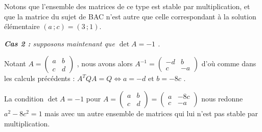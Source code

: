 \medskip

Notons que l'ensemble des matrices de ce type est stable par multiplication, et que la matrice du sujet de BAC n'est autre que celle correspondant à la solution élémentaire
$(a \,; c) = (3 \,; 1)$.




\bigskip

\textit{\textbf{Cas 2 :} supposons maintenant que $\det A = -1$ .}

\medskip

Notant
$A = \begin{pmatrix} 
  a & b \\ 
  c & d
\end{pmatrix}$ ,
nous avons alors
$A^{-1} = \begin{pmatrix} 
  -d & b  \\ 
   c & -a
\end{pmatrix}$
d'où comme dans les calculs précédents :
$A^T Q A = Q \Longleftrightarrow a = -d \text{ et } b = -8c$ .


\bigskip

La condition $\det A = -1$ pour
$A
=
\begin{pmatrix} 
  a & b \\ 
  c & d
\end{pmatrix}
=
\begin{pmatrix} 
  a & -8c \\ 
  c & -a
\end{pmatrix}$
nous redonne
$a^2 - 8c^2 = 1$ mais avec un autre ensemble de matrices qui lui n'est pas stable par multiplication.

